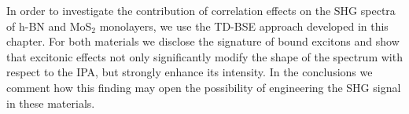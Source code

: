 
In order to investigate the contribution of correlation effects on the SHG spectra of h-BN and MoS$_2$ monolayers, we use the TD-BSE approach developed in this chapter. For both materials we disclose the signature of bound excitons and show that excitonic effects not only significantly modify the shape of the spectrum with respect to the IPA, but strongly enhance its intensity. In the conclusions we comment how this finding may open the possibility of engineering the SHG signal in these materials. 



